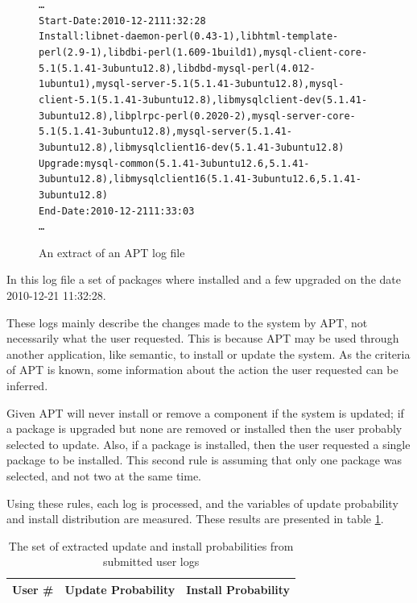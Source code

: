 \begin{figure}[htp]
\begin{center}
\begin{alltt}
\ldots
Start-Date: 2010-12-21 11:32:28
Install: libnet-daemon-perl (0.43-1), libhtml-template-perl (2.9-1), libdbi-perl (1.609-1build1), mysql-client-core-5.1 (5.1.41-3ubuntu12.8), libdbd-mysql-perl (4.012-1ubuntu1), mysql-server-5.1 (5.1.41-3ubuntu12.8), mysql-client-5.1 (5.1.41-3ubuntu12.8), libmysqlclient-dev (5.1.41-3ubuntu12.8), libplrpc-perl (0.2020-2), mysql-server-core-5.1 (5.1.41-3ubuntu12.8), mysql-server (5.1.41-3ubuntu12.8), libmysqlclient16-dev (5.1.41-3ubuntu12.8)
Upgrade: mysql-common (5.1.41-3ubuntu12.6, 5.1.41-3ubuntu12.8), libmysqlclient16 (5.1.41-3ubuntu12.6, 5.1.41-3ubuntu12.8)
End-Date: 2010-12-21 11:33:03
\ldots
\end{alltt}
\caption[APT log extract]{An extract of an APT log file}
\label{aptlog}
\end{center}
\end{figure}

In this log file a set of packages where installed and a few upgraded on the date 2010-12-21 11:32:28. 

These logs mainly describe the changes made to the system by APT, not necessarily what the user requested.
This is because APT may be used through another application, like semantic, to install or update the system.
As the criteria of APT is known, some information about the action the user requested can be inferred.

Given APT will never install or remove a component if the system is updated; 
if a package is upgraded but none are removed or installed then the user probably selected to update.
Also, if a package is installed, then the user requested a single package to be installed.
This second rule is assuming that only one package was selected, and not two at the same time.

Using these rules, each log is processed, and the variables of update probability and install distribution are measured.
These results are presented in table \ref{userlogvariables}.

\begin{table}
\begin{tabular}{|l|l ||  p{8.5cm}|}
\hline User \# & Update Probability & Install Probability  \\ \hline \hline


\end{tabular}
\caption[Extracted User Log Information]{The set of extracted update and install probabilities from submitted user logs}
\label{userlogvariables}
\end{table}


